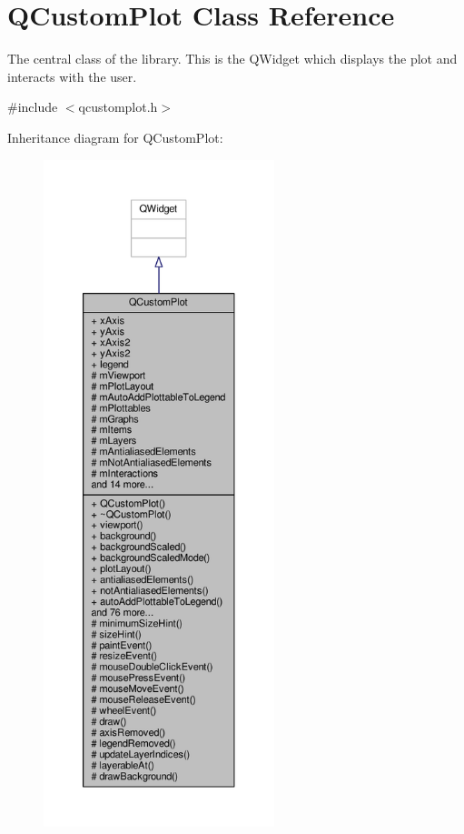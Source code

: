 \hypertarget{class_q_custom_plot}{}\section{Q\+Custom\+Plot Class Reference}
\label{class_q_custom_plot}


The central class of the library. This is the Q\+Widget which displays the plot and interacts with the user.  




{\ttfamily \#include $<$qcustomplot.\+h$>$}



Inheritance diagram for Q\+Custom\+Plot\+:\nopagebreak
\begin{figure}[H]
\begin{center}
\leavevmode
\includegraphics[height=550pt]{class_q_custom_plot__inherit__graph}
\end{center}
\end{figure}



